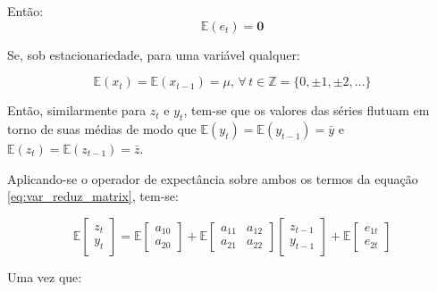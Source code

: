 Então:
\begin{equation} \mathbb{E}(e_t) = \textbf{0} \end{equation}

Se, sob estacionariedade, para uma variável qualquer:

\begin{equation}
 \mathbb{E} \left( x_t \right) = \mathbb{E} \left( x_{t-1} \right) = \mu, \, \forall \, t \in \mathbb{Z} = \{0, \pm1, \pm2, ...\}
\end{equation}

Então, similarmente para \(z_t\) e \(y_t\), tem-se que os valores das séries flutuam em torno de suas médias de modo que \(\mathbb{E} \left( y_t \right) = \mathbb{E} \left( y_{t-1} \right) = \bar{y}\) e \(\mathbb{E} \left( z_t \right) = \mathbb{E} \left( z_{t-1} \right) = \bar{z}\).
 
Aplicando-se o operador de expectância sobre ambos os termos da equação \eqref{eq:var_reduz_matrix}, tem-se: 

\begin{equation}
\label{eq:expect_var}
\mathbb{E} \begin{bmatrix}z_t \\y_t\end{bmatrix} 
= 
\mathbb{E}\begin{bmatrix}a_{10} \\ a_{20}\end{bmatrix} 
+
\mathbb{E}\begin{bmatrix}
a_{11} & a_{12}\\a_{21} & a_{22}
\end{bmatrix}
\begin{bmatrix}z_{t-1} \\ y_{t-1}\end{bmatrix}
+
\mathbb{E}\begin{bmatrix}e_{1t} \\ e_{2t}\end{bmatrix}
\end{equation}

Uma vez que: 

